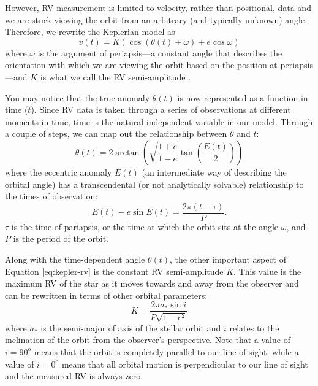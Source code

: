 However, RV measurement is limited to velocity, rather than positional, data and we are stuck viewing the orbit from an arbitrary (and typically unknown) angle. Therefore, we rewrite the Keplerian model as
\begin{equation}
    v(t) = K (\cos{(\theta(t)+\omega)} + e \cos{\omega})
    \label{eq:kepler-rv}
\end{equation}
where $\omega$ is the argument of periapsis---a constant angle that describes the orientation with which we are viewing the orbit based on the position at periapsis---and $K$ is what we call the RV semi-amplitude \citep{lovis_radial_2011}.

You may notice that the true anomaly $\theta(t)$ is now represented as a function in time ($t$). Since RV data is taken through a series of observations at different moments in time, time is the natural independent variable in our model. Through a couple of steps, we can map out the relationship between $\theta$ and $t$:
\begin{equation}
    \theta(t) = 2 \arctan{\left(\sqrt{\frac{1+e}{1-e}}\tan{\left(\frac{E(t)}{2}\right)}\right)}
    \label{eq:mean-anomaly}
\end{equation}
where the eccentric anomaly $E(t)$ (an intermediate way of describing the orbital angle) has a transcendental (or not analytically solvable) relationship to the times of observation:
\begin{equation}
    E(t) - e \sin{E(t)} = \frac{2\pi (t - \tau)}{P}.
    \label{eq:eccentric-anomaly}
\end{equation}
$\tau$ is the time of pariapsis, or the time at which the orbit sits at the angle $\omega$, and $P$ is the period of the orbit.

Along with the time-dependent angle $\theta(t)$, the other important aspect of Equation \ref{eq:kepler-rv} is the constant RV semi-amplitude $K$. This value is the maximum RV of the star as it moves towards and away from the observer and can be rewritten in terms of other orbital parameters:
\begin{equation}
    K = \frac{2\pi a_* \sin{i}}{P\sqrt{1-e^2}}
    \label{eq:rv-semi-amplitude}
\end{equation}
where $a_*$ is the semi-major of axis of the stellar orbit and $i$ relates to the inclination of the orbit from the observer's perspective. Note that a value of $i=90^\mathrm{o}$ means that the orbit is completely parallel to our line of sight, while a value of $i=0^\mathrm{o}$ means that all orbital motion is perpendicular to our line of sight and the measured RV is always zero.

